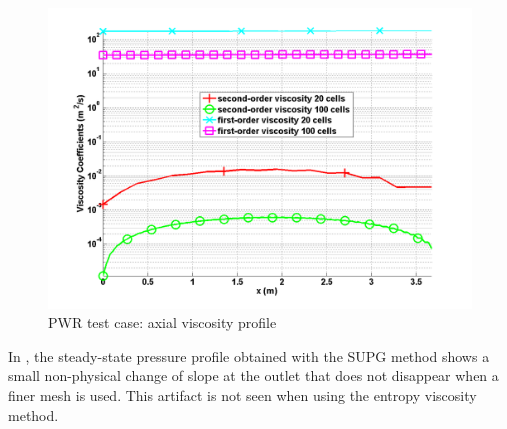 \begin{figure}[ht]
\centering
\includegraphics[width=\textwidth]{figures/PWR_stt_viscosity.png}
\caption{PWR test case: axial viscosity profile}
\label{fig:Viscosity}
\end{figure}
%
In , the steady-state pressure profile obtained with the SUPG method shows a small non-physical change of slope at the outlet that does not disappear when a finer mesh is used. This artifact is not seen when using the entropy viscosity method. \\

